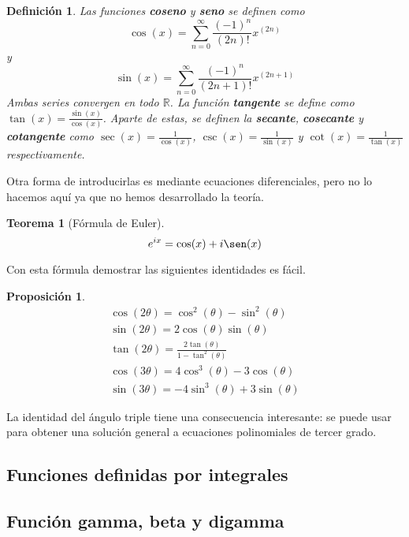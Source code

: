 \documentclass{article}
\newtheorem{theorem}{Teorema}
\newtheorem{prop}{Proposición}
\newtheorem{define}{Definición}
\newcommand{\reales}{\mathbb{R}}
\begin{document}
\begin{define}
	Las funciones \textbf{coseno} y \textbf{seno} se definen como
	\begin{equation*}
		\cos(x) = \sum_{n=0}^{\infty} \frac{(-1)^n}{(2n)!} x^{(2n)}
	\end{equation*}
	y
	\begin{equation*}
		\sin(x) = \sum_{n=0}^{\infty} \frac{(-1)^n}{(2n+1)!} x^{(2n+1)}
	\end{equation*}
	Ambas series convergen en todo $\reales$.
	La función \textbf{tangente} se define como $\tan(x) = \frac{\sin(x)}{\cos(x)}$.
	Aparte de estas, se definen la \textbf{secante}, \textbf{cosecante} y \textbf{cotangente} como $\sec(x) = \frac{1}{\cos(x)}$, $\csc(x) = \frac{1}{\sin(x)}$ y $\cot(x) = \frac{1}{\tan(x)}$ respectivamente.
\end{define}

Otra forma de introducirlas es mediante ecuaciones diferenciales, pero no lo hacemos aquí ya que no hemos desarrollado la teoría.\\ 

\begin{theorem}[Fórmula de Euler]
	\begin{equation*}
		e^{ix} = \cos(x) + i\sen(x)
	\end{equation*}
\end{theorem}

Con esta fórmula demostrar las siguientes identidades es fácil.

\begin{prop}
	\begin{eqnarray*}
		\cos(2\theta) = \cos^2(\theta) - \sin^2(\theta) \\ 
		\sin(2\theta) = 2\cos(\theta)\sin(\theta) \\ 
		\tan(2\theta) = \frac{2\tan(\theta)}{1 - \tan^2(\theta)} \\ 
		\cos(3\theta) = 4\cos^3(\theta) - 3\cos(\theta) \\ 
		\sin(3\theta) = -4\sin^3(\theta) + 3\sin(\theta)
	\end{eqnarray*}
\end{prop}

La identidad del ángulo triple tiene una consecuencia interesante: se puede usar para obtener una solución general a ecuaciones polinomiales de tercer grado.

\subsection{Funciones definidas por integrales}

\subsection{Función gamma, beta y digamma}
\end{document}
